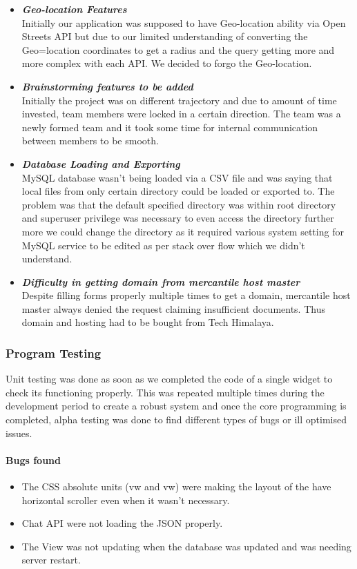 \documentclass[12pt]{article}
\begin{document}
\begin{itemize}
    \item \textit{\textbf{Geo-location Features}}\\
    Initially our application was supposed to have Geo-location ability via Open Streets API but due to our limited understanding of converting the Geo=location coordinates to get a radius and the query getting more and more complex with each API. We decided to forgo the Geo-location.
    \item \textit{\textbf{Brainstorming features to be added}}\\
        Initially the project was on different trajectory and due to amount of time invested, team members were locked in a certain direction. The team was a newly formed team and it took some time for internal communication between members to be smooth.
    \item \textit{\textbf{Database Loading and Exporting}}\\
        MySQL database wasn't being loaded via a CSV file and was saying that local files from only certain directory could be loaded or exported to. The problem was that the default specified directory was within root directory and superuser privilege was necessary to even access the directory further more we could change the directory as it required various system setting for MySQL service to be edited as per stack over flow which we didn't understand.
    \item \textit{\textbf{Difficulty in getting domain from mercantile host master}}\\
        Despite filling forms properly multiple times to get a domain, mercantile host master always denied the request claiming insufficient documents. Thus domain and hosting had to be bought from Tech Himalaya.
\end{itemize}
\subsubsection{Program Testing}
Unit testing was done as soon as we completed the code of a single widget to check its functioning properly. This was repeated multiple times during the development 
period to create a robust system and once the core programming is completed, alpha testing was done to find different types of bugs or ill optimised issues.
\paragraph{Bugs found}
\begin{itemize}
    \item The CSS absolute units (vw and vw) were making the layout of the have horizontal scroller even when it wasn't necessary.
    \item Chat API were not loading the JSON properly.
    \item The View was not updating when the database was updated and was needing server restart.
\end{itemize}
\end{document}
